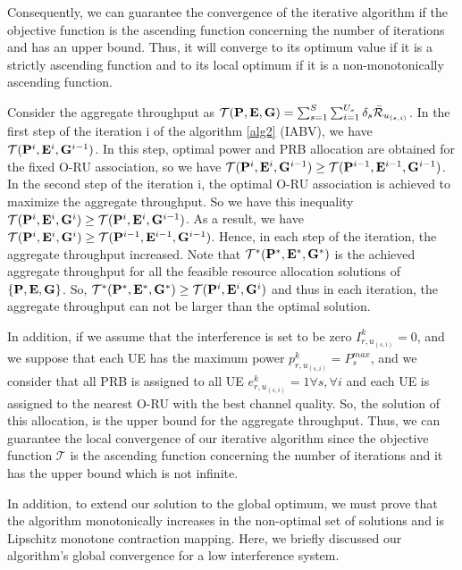 \documentclass[lettersize,journal]{IEEEtran}
\begin{document}
Consequently, we can guarantee the convergence of the iterative algorithm if the objective function is the ascending function concerning the number of iterations and has an upper bound. Thus, it will converge to its optimum value if it is a strictly ascending function and to its local optimum if it is a non-monotonically ascending function. 

Consider the aggregate throughput as $\mathcal{T(\bold{P},\bold{E},\bold{G})} =\sum_{s=1}^{S}\sum_{i=1}^{U_s}\delta_s \bar{\mathcal{R}}_{u_{(s,i)}}$.
In the first step of the iteration i of the algorithm \ref{alg2} (IABV), we have $\mathcal{T}(\bold{P}^{i},\bold{E}^i,\bold{G}^{i-1})$.
In this step, optimal power and PRB allocation are obtained for the fixed O-RU association, so we have
$\mathcal{T}(\bold{P}^{i},\bold{E}^i,\bold{G}^{i-1}) \geq \mathcal{T}(\bold{P}^{i-1},\bold{E}^{i-1},\bold{G}^{i-1})$.
In the second step of the iteration i, the optimal O-RU association is achieved to maximize the aggregate throughput. So we have this inequality
$\mathcal{T}(\bold{P}^{i},\bold{E}^i,\bold{G}^{i}) \geq \mathcal{T}(\bold{P}^{i},\bold{E}^{i},\bold{G}^{i-1})$.
As a result, we have
$\mathcal{T}(\bold{P}^{i},\bold{E}^i,\bold{G}^{i}) \geq \mathcal{T}(\bold{P}^{i-1},\bold{E}^{i-1},\bold{G}^{i-1})$.
Hence, in each step of the iteration, the aggregate throughput increased.
Note that $\mathcal{T}^*(\bold{P}^{*},\bold{E}^*,\bold{G}^{*})$ is the achieved aggregate throughput
for all the feasible resource allocation solutions of $\{\bold{P},\bold{E},\bold{G}\}$.
So, $\mathcal{T}^*(\bold{P}^{*},\bold{E}^*,\bold{G}^{*}) \geq \mathcal{T}(\bold{P}^{i},\bold{E}^i,\bold{G}^{i})$ and thus in each iteration, the aggregate throughput can not be larger than the optimal solution.
 
In addition, if we assume that the interference is set to be zero ${I}_{r,u_{(s,i)}}^{k}=0$,
and we suppose that each UE has the maximum power $p_{r,u_{(s,i)}}^k = P_{s}^{max}$,
and we consider that all PRB is assigned to all UE $e_{r,u_{(s,i)}}^k = 1 \forall s,\forall i$
and each UE is assigned to the nearest O-RU with the best channel quality. So, the solution of this allocation, is the upper bound
for the aggregate throughput.
Thus,
we can guarantee the local convergence of our iterative algorithm since the objective function $\mathcal{T}$ is the ascending function concerning the number of iterations
 and it has the upper bound which is not infinite.

In addition, to extend our solution to the global optimum, we must prove that the algorithm monotonically increases in the non-optimal set of solutions and is Lipschitz monotone contraction mapping. Here, we briefly discussed our algorithm's global convergence for a low interference system.
 
\end{document}
